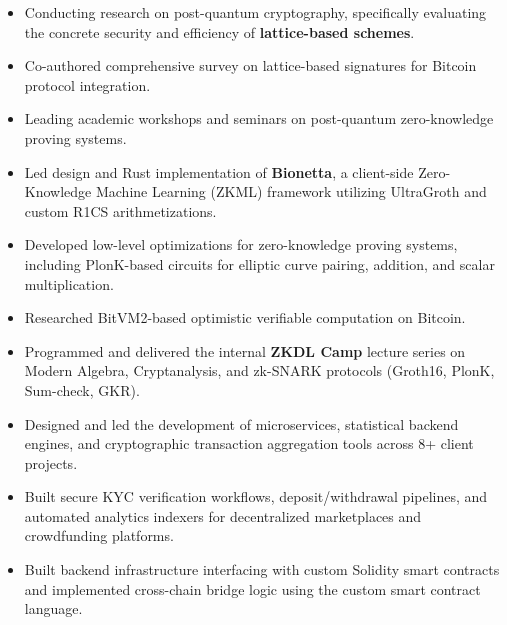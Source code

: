 \documentclass[10pt,a4paper,ragged2e]{maltacv}
\begin{document}

\begin{itemize}
  \item Conducting research on post-quantum cryptography, specifically evaluating the concrete security and efficiency of \textbf{lattice-based schemes}.
  \item Co-authored comprehensive survey on lattice-based signatures for Bitcoin protocol integration.
  \item Leading academic workshops and seminars on post-quantum zero-knowledge proving systems.
\end{itemize}

\divider

\begin{itemize}
  \item Led design and Rust implementation of \textbf{Bionetta}, a client-side Zero-Knowledge Machine Learning (ZKML) framework utilizing UltraGroth and custom R1CS arithmetizations.
  \item Developed low-level optimizations for zero-knowledge proving systems, including PlonK-based circuits for elliptic curve pairing, addition, and scalar multiplication.
  \item Researched BitVM2-based optimistic verifiable computation on Bitcoin.
  \item Programmed and delivered the internal \textbf{ZKDL Camp} lecture series on Modern Algebra, Cryptanalysis, and zk-SNARK protocols (Groth16, PlonK, Sum-check, GKR).
\end{itemize}

\divider

\begin{itemize}
  \item Designed and led the development of microservices, statistical backend engines, and cryptographic transaction aggregation tools across 8+ client projects.
  \item Built secure KYC verification workflows, deposit/withdrawal pipelines, and automated analytics indexers for decentralized marketplaces and crowdfunding platforms.
  \item Built backend infrastructure interfacing with custom Solidity smart contracts and implemented cross-chain bridge logic using the custom smart contract language.
\end{itemize}
\end{document}
